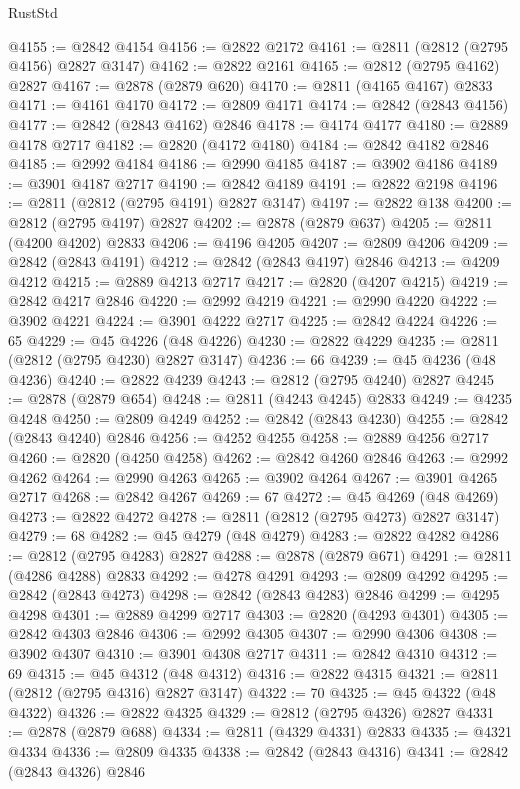 \begin{lexlean}{RustStd}
\begin{coremodule}
{\begin{coremodule}
{{{{{{{{{{{{{{{{{{{{{{{{{{{{{{{{{@4155 := @2842 @4154
@4156 := @2822 @2172
@4161 := @2811 (@2812 (@2795 @4156) @2827 @3147)
@4162 := @2822 @2161
@4165 := @2812 (@2795 @4162) @2827
@4167 := @2878 (@2879 @620)
@4170 := @2811 (@4165 @4167) @2833
@4171 := @4161 @4170
@4172 := @2809 @4171
@4174 := @2842 (@2843 @4156)
@4177 := @2842 (@2843 @4162) @2846
@4178 := @4174 @4177
@4180 := @2889 @4178 @2717
@4182 := @2820 (@4172 @4180)
@4184 := @2842 @4182 @2846
@4185 := @2992 @4184
@4186 := @2990 @4185
@4187 := @3902 @4186
@4189 := @3901 @4187 @2717
@4190 := @2842 @4189
@4191 := @2822 @2198
@4196 := @2811 (@2812 (@2795 @4191) @2827 @3147)
@4197 := @2822 @138
@4200 := @2812 (@2795 @4197) @2827
@4202 := @2878 (@2879 @637)
@4205 := @2811 (@4200 @4202) @2833
@4206 := @4196 @4205
@4207 := @2809 @4206
@4209 := @2842 (@2843 @4191)
@4212 := @2842 (@2843 @4197) @2846
@4213 := @4209 @4212
@4215 := @2889 @4213 @2717
@4217 := @2820 (@4207 @4215)
@4219 := @2842 @4217 @2846
@4220 := @2992 @4219
@4221 := @2990 @4220
@4222 := @3902 @4221
@4224 := @3901 @4222 @2717
@4225 := @2842 @4224
@4226 := 65
@4229 := @45 @4226 (@48 @4226)
@4230 := @2822 @4229
@4235 := @2811 (@2812 (@2795 @4230) @2827 @3147)
@4236 := 66
@4239 := @45 @4236 (@48 @4236)
@4240 := @2822 @4239
@4243 := @2812 (@2795 @4240) @2827
@4245 := @2878 (@2879 @654)
@4248 := @2811 (@4243 @4245) @2833
@4249 := @4235 @4248
@4250 := @2809 @4249
@4252 := @2842 (@2843 @4230)
@4255 := @2842 (@2843 @4240) @2846
@4256 := @4252 @4255
@4258 := @2889 @4256 @2717
@4260 := @2820 (@4250 @4258)
@4262 := @2842 @4260 @2846
@4263 := @2992 @4262
@4264 := @2990 @4263
@4265 := @3902 @4264
@4267 := @3901 @4265 @2717
@4268 := @2842 @4267
@4269 := 67
@4272 := @45 @4269 (@48 @4269)
@4273 := @2822 @4272
@4278 := @2811 (@2812 (@2795 @4273) @2827 @3147)
@4279 := 68
@4282 := @45 @4279 (@48 @4279)
@4283 := @2822 @4282
@4286 := @2812 (@2795 @4283) @2827
@4288 := @2878 (@2879 @671)
@4291 := @2811 (@4286 @4288) @2833
@4292 := @4278 @4291
@4293 := @2809 @4292
@4295 := @2842 (@2843 @4273)
@4298 := @2842 (@2843 @4283) @2846
@4299 := @4295 @4298
@4301 := @2889 @4299 @2717
@4303 := @2820 (@4293 @4301)
@4305 := @2842 @4303 @2846
@4306 := @2992 @4305
@4307 := @2990 @4306
@4308 := @3902 @4307
@4310 := @3901 @4308 @2717
@4311 := @2842 @4310
@4312 := 69
@4315 := @45 @4312 (@48 @4312)
@4316 := @2822 @4315
@4321 := @2811 (@2812 (@2795 @4316) @2827 @3147)
@4322 := 70
@4325 := @45 @4322 (@48 @4322)
@4326 := @2822 @4325
@4329 := @2812 (@2795 @4326) @2827
@4331 := @2878 (@2879 @688)
@4334 := @2811 (@4329 @4331) @2833
@4335 := @4321 @4334
@4336 := @2809 @4335
@4338 := @2842 (@2843 @4316)
@4341 := @2842 (@2843 @4326) @2846
}}}}}}}}}}}}}}}}}}}}}}}}}}}}}}}}}
\end{coremodule}}
\end{coremodule}
\end{lexlean}
